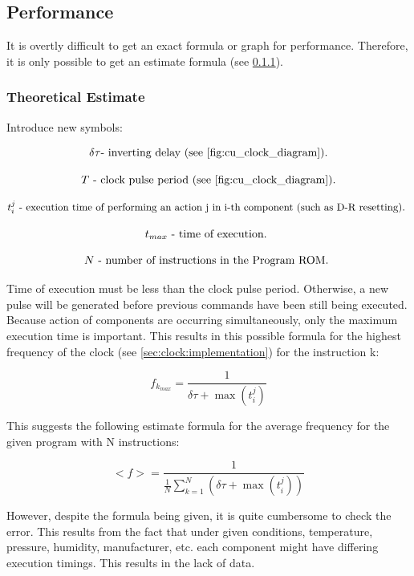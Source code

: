 \subsection{Performance} \label{sec:control_unit:performance}
It is overtly difficult to get an exact formula or graph for performance. Therefore, it is only possible to get an estimate formula (see \ref{sec:control_unit:performance:theretical_estimate}).

\subsubsection{Theoretical Estimate} \label{sec:control_unit:performance:theretical_estimate}
Introduce new symbols:

\[\delta \tau \textmd{- inverting delay (see \ref{fig:cu_clock_diagram}).}\]

\[T \textmd{ - clock pulse period (see \ref{fig:cu_clock_diagram}).}\]

\[t_{i}^{j} \textmd{ - execution time of performing an action j in i-th component (such as D-R resetting). } \]

\[t_{max} \textmd{ - time of execution. }\]

\[N \textmd{ - number of instructions in the Program ROM. }\]

Time of execution must be less than the clock pulse period. Otherwise, a new pulse will be generated before previous commands have been still being executed. Because action of components are occurring simultaneously, only the maximum execution time is important. This results in this possible formula for the highest frequency of the clock (see \ref{sec:clock:implementation}) for the instruction k:

\[ f_{k_{max}} = \frac{1}{\delta \tau + \max{(t_{i}^{j})}} \]

This suggests the following estimate formula for the average frequency for the given program with N instructions: 

\[ <f> = \frac{1}{\frac{1}{N} \sum_{k = 1}^{N} (\delta \tau + \max{(t_{i}^{j})})} \]

However, despite the formula being given, it is quite cumbersome to check the error. This results from the fact that under given conditions, temperature, pressure, humidity, manufacturer, etc. each component might have differing execution timings. This results in the lack of data.





